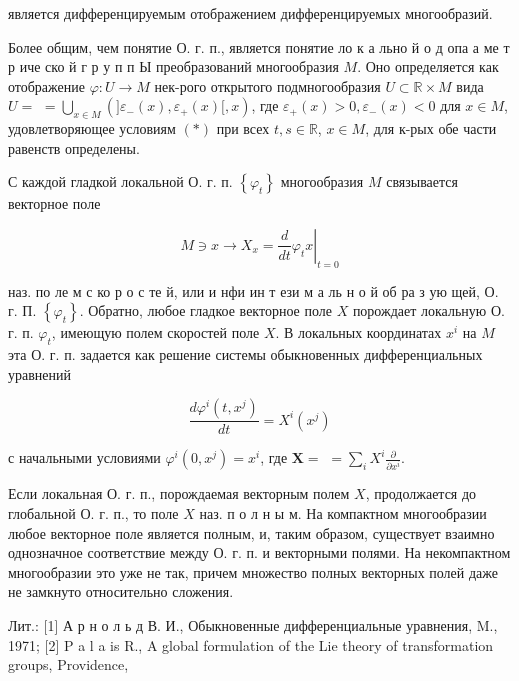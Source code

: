 \documentclass[10pt]{article}
\begin{document}
является дифференцируемым отображением дифференцируемых многообразий.



Более общим, чем понятие О. г. п., является понятие ло к а льно й о д опа а ме т р иче ско й г р у п п Ы преобразований многообразия $M$. Оно определяется как отображение $\varphi: U \rightarrow M$ нек-рого открытого подмногообразия $U \subset \mathbb{R} \times M$ вида $U=$ $=\bigcup_{x \in M}(] \varepsilon_{-}(x), \varepsilon_{+}(x)[, x)$, где $\varepsilon_{+}(x)>0, \varepsilon_{-}(x)<0$ для $x \in M$, удовлетворяющее условиям $(*)$ при всех $t, s \in \mathbb{R}$, $x \in M$, для к-рых обе части равенств определены.



С каждой гладкой локальной О. г. п. $\left\{\varphi_{t}\right\}$ многообразия $M$ связывается векторное поле



\[

M \ni x \rightarrow X_{x}=\left.\frac{d}{d t} \varphi_{t} x\right|_{t=0}

\]



наз. по ле м с ко р о с те й, или и нфи ин т ези м а ль н о й об ра з ую щей, О. г. П. $\left\{\varphi_{t}\right\}$. Обратно, любое гладкое векторное поле $X$ порождает локальную О. г. п. $\varphi_{t}$, имеющую полем скоростей поле $X$. В локальных координатах $x^{i}$ на $M$ эта О. г. п. задается как решение системы обыкновенных дифференциальных уравнений



\[

\frac{d \varphi^{i}\left(t, x^{j}\right)}{d t}=X^{i}\left(x^{j}\right)

\]



с начальными условиями $\varphi^{i}\left(0, x^{j}\right)=x^{i}$, где $\boldsymbol{X}=$ $=\sum_{i} X^{i} \frac{\partial}{\partial x^{i}}$.



Если локальная О. г. п., порождаемая векторным полем $X$, продолжается до глобальной О. г. п., то поле $X$ наз. п о л н ы м. На компактном многообразии любое векторное поле является полным, и, таким образом, существует взаимно однозначное соответствие между О. г. п. и векторными полями. На некомпактном многообразии это уже не так, причем множество полных векторных полей даже не замкнуто относительно сложения.



Лит.: [1] А р н о л ь д В. И., Обыкновенные дифференциальные уравнения, M., 1971; [2] P a l a is R., A global formulation of the Lie theory of transformation groups, Providence,
\end{document}
